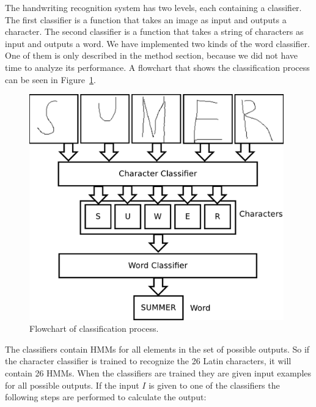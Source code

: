 
The handwriting recognition system has two levels, each containing a classifier. 
The first classifier is a function that takes an image as input and outputs a character. 
The second classifier is a function that takes a string of characters as input and outputs a word.
We have implemented two kinds of the word classifier.
One of them is only described in the method section, because we did not have time to analyze its performance.
A flowchart that shows the classification process can be seen in Figure~\ref{fig:classification_system_overview}. 

    \begin{figure}[htb] 
      \begin{center}
	\leavevmode
	\includegraphics[width=110mm]{classification_system_overview.pdf}%
      \end{center}
      \caption{Flowchart of classification process.}
      \label{fig:classification_system_overview}
    \end{figure}

The classifiers contain HMMs for all elements in the set of possible outputs. 
So if the character classifier is trained to recognize the 26 Latin characters, it will contain 26 HMMs. 
When the classifiers are trained they are given input examples for all possible outputs. 
If the input $I$ is given to one of the classifiers the following steps are performed to calculate the output:

